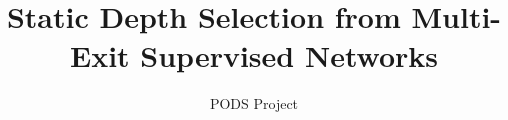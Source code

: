 \documentclass{article}
\begin{document}
\title{Static Depth Selection from Multi-Exit Supervised Networks}
\author{PODS Project}
\date{}
\maketitle











\end{document}
